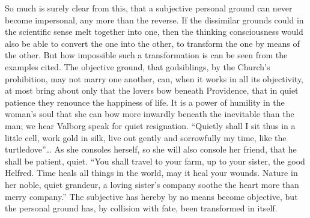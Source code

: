 \documentclass[12pt,a4paper,openany]{book}
\begin{document}
So much is surely clear from this, that a subjective personal
ground can never become impersonal, any more than
the reverse. If the dissimilar grounds could in the scientific
sense melt together into one, then the thinking
consciousness would also be able to convert
the one into the other, to transform the one by means of
the other. But how impossible such a transformation is
can be seen from the examples cited. The objective ground,
that godsiblings, by the Church's prohibition, may not marry
one another, can, when it works in all its objectivity,
at most bring about only that the lovers bow beneath
Providence, that in quiet patience they renounce
the happiness of life. It is a power of humility in the woman's
soul that she can bow more inwardly beneath
the inevitable than the man; we hear Valborg
speak for quiet resignation. ``Quietly shall I sit
thus in a little cell, work gold in silk, live out gently
and sorrowfully my time, like the turtledove''\dots{} As she
consoles herself, so she will also console her friend, that he
shall be patient, quiet. ``You shall travel to your
farm, up to your sister, the good Helfred. Time heals
all things in the world, may it heal your wounds. Nature in her noble,
quiet grandeur, a loving sister's company soothe the heart
more than merry company.'' The subjective has hereby
by no means become objective, but the personal ground
has, by collision with fate, been transformed in itself.
\end{document}
